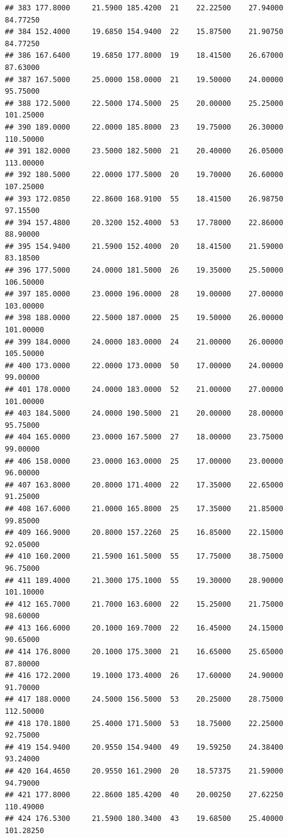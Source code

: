 \documentclass[]{article}
\begin{document}
\begin{verbatim}
## 383 177.8000     21.5900 185.4200  21    22.22500    27.94000  84.77250
## 384 152.4000     19.6850 154.9400  22    15.87500    21.90750  84.77250
## 386 167.6400     19.6850 177.8000  19    18.41500    26.67000  87.63000
## 387 167.5000     25.0000 158.0000  21    19.50000    24.00000  95.75000
## 388 172.5000     22.5000 174.5000  25    20.00000    25.25000 101.25000
## 390 189.0000     22.0000 185.8000  23    19.75000    26.30000 110.50000
## 391 182.0000     23.5000 182.5000  21    20.40000    26.05000 113.00000
## 392 180.5000     22.0000 177.5000  20    19.70000    26.60000 107.25000
## 393 172.0850     22.8600 168.9100  55    18.41500    26.98750  97.15500
## 394 157.4800     20.3200 152.4000  53    17.78000    22.86000  88.90000
## 395 154.9400     21.5900 152.4000  20    18.41500    21.59000  83.18500
## 396 177.5000     24.0000 181.5000  26    19.35000    25.50000 106.50000
## 397 185.0000     23.0000 196.0000  28    19.00000    27.00000 103.00000
## 398 188.0000     22.5000 187.0000  25    19.50000    26.00000 101.00000
## 399 184.0000     24.0000 183.0000  24    21.00000    26.00000 105.50000
## 400 173.0000     22.0000 173.0000  50    17.00000    24.00000  99.00000
## 401 178.0000     24.0000 183.0000  52    21.00000    27.00000 101.00000
## 403 184.5000     24.0000 190.5000  21    20.00000    28.00000  95.75000
## 404 165.0000     23.0000 167.5000  27    18.00000    23.75000  99.00000
## 406 158.0000     23.0000 163.0000  25    17.00000    23.00000  96.00000
## 407 163.8000     20.8000 171.4000  22    17.35000    22.65000  91.25000
## 408 167.6000     21.0000 165.8000  25    17.35000    21.85000  99.85000
## 409 166.9000     20.8000 157.2260  25    16.85000    22.15000  92.05000
## 410 160.2000     21.5900 161.5000  55    17.75000    38.75000  96.75000
## 411 189.4000     21.3000 175.1000  55    19.30000    28.90000 101.10000
## 412 165.7000     21.7000 163.6000  22    15.25000    21.75000  98.60000
## 413 166.6000     20.1000 169.7000  22    16.45000    24.15000  90.65000
## 414 176.8000     20.1000 175.3000  21    16.65000    25.65000  87.80000
## 416 172.2000     19.1000 173.4000  26    17.60000    24.90000  91.70000
## 417 188.0000     24.5000 156.5000  53    20.25000    28.75000 112.50000
## 418 170.1800     25.4000 171.5000  53    18.75000    22.25000  92.75000
## 419 154.9400     20.9550 154.9400  49    19.59250    24.38400  93.24000
## 420 164.4650     20.9550 161.2900  20    18.57375    21.59000  94.79000
## 421 177.8000     22.8600 185.4200  40    20.00250    27.62250 110.49000
## 424 176.5300     21.5900 180.3400  43    19.68500    25.40000 101.28250

\end{verbatim}
\end{document}

